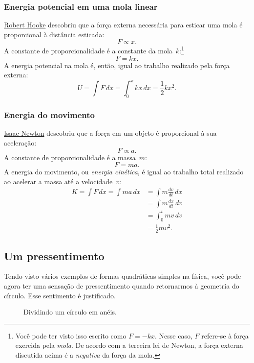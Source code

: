     \subsubsection{Energia potencial em uma mola linear} %
    \label{sec:potential_energy_in_a_linear_spring}

\href{https://pt.wikipedia.org/wiki/Robert_Hooke}{Robert Hooke} descobriu que a força externa necessária para esticar uma mola é proporcional à distância esticada:
\[ F \propto x. \]
A constante de proporcionalidade é a constante da mola~$k$:\footnote{Você pode ter visto isso escrito como $F = -kx$. Nesse caso, $F$ refere-se à força exercida pela \emph{mola}. De acordo com a terceira lei de Newton, a força externa discutida acima é a \emph{negativa} da força da mola.}
\[ F = k x. \]
A energia potencial na mola é, então, igual ao trabalho realizado pela força externa:
\[ U = \int F\,dx = \int_0^x kx\,dx = \textstyle{\frac{1}{2}} kx^2. \]

    \subsubsection{Energia do movimento} %
    \label{sec:energy_of_motion}

\href{https://pt.wikipedia.org/wiki/Isaac_Newton}{Isaac Newton} descobriu que a força em um objeto é proporcional à sua aceleração:
\[ F \propto a. \]
A constante de proporcionalidade é a massa~$m$:
\[ F = m a. \]
A energia do movimento, ou \emph{energia cinética}, é igual ao trabalho total realizado ao acelerar a massa até a velocidade~$v$:
\[
\begin{split}
K = \int F\,dx = \int ma\,dx & = \int m\frac{dv}{dt}\,dx \\ & = \int m\frac{dx}{dt}\,dv \\ & = \int_0^v mv\,dv \\ & = \textstyle{\frac{1}{2}} mv^2.
\end{split}
\]

  \subsection{Um pressentimento} %
  \label{sec:a_sense_of_foreboding}

Tendo visto vários exemplos de formas quadráticas simples na física, você pode agora ter uma sensação de pressentimento quando retornarmos à geometria do círculo. Esse sentimento é justificado.

\begin{figure}
\begin{center}
\end{center}
\caption{Dividindo um círculo em anéis.\label{fig:circular_area}}
\end{figure}



